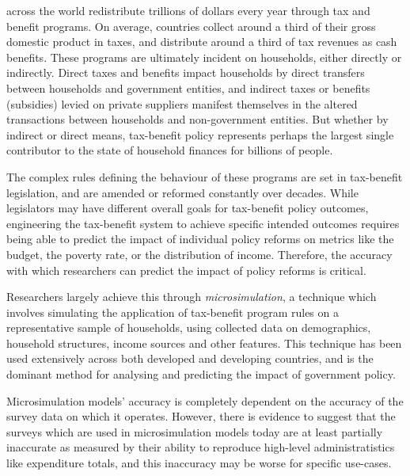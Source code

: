 \documentclass[10pt,journal,compsoc]{IEEEtran}
\begin{document}
% 
% 
 across the world redistribute trillions of dollars every year through tax and benefit programs. On average, countries collect around a third of their gross domestic product in taxes, and distribute around a third of tax revenues as cash benefits. These programs are ultimately incident on households, either directly or indirectly. Direct taxes and benefits impact households by direct transfers between households and government entities, and indirect taxes or benefits (subsidies) levied on private suppliers manifest themselves in the altered transactions between households and non-government entities. But whether by indirect or direct means, tax-benefit policy represents perhaps the largest single contributor to the state of household finances for billions of people. 

The complex rules defining the behaviour of these programs are set in tax-benefit legislation, and are amended or reformed constantly over decades. While legislators may have different overall goals for tax-benefit policy outcomes, engineering the tax-benefit system to achieve specific intended outcomes requires being able to predict the impact of individual policy reforms on metrics like the budget, the poverty rate, or the distribution of income. Therefore, the accuracy with which researchers can predict the impact of policy reforms is critical.

Researchers largely achieve this through \emph{microsimulation}, a technique which involves simulating the application of tax-benefit program rules on a representative sample of households, using collected data on demographics, household structures, income sources and other features. This technique has been used extensively across both developed and developing countries, and is the dominant method for analysing and predicting the impact of government policy.

Microsimulation models' accuracy is completely dependent on the accuracy of the survey data on which it operates. However, there is evidence to suggest that the surveys which are used in microsimulation models today are at least partially inaccurate as measured by their ability to reproduce high-level administratistics like expenditure totals, and this inaccuracy may be worse for specific use-cases.
\end{document}
